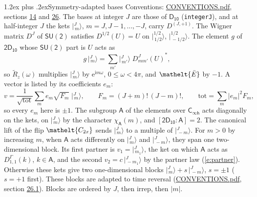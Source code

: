 \documentclass[10pt,a4paper]{article}
\makeatletter
\renewcommand\section{\@startsection{section}{1}{\z@}{-3ex plus -1ex minus -.2ex}%
  {1.2ex plus .2ex}{\normalfont\large\sffamily\bfseries\color{parttitle}}}
\numberwithin{equation}{section}
\newcommand{\eltfont}[1]{{\let\sigma\eltsigma\mathelt{#1}}}
\newcommand{\grp}[1]{\mathsf{#1}}
\newcommand{\elt}[1]{\eltfont{#1}}
\newcommand{\grpindex}[2]{[#1 : #2]}
\newcommand{\iunit}{\mathrm{i}}
\newcommand{\expe}{\mathrm{e}}
\newcommand{\irrJp}[2]{D^{(#1,#2)}}
\newcommand{\repD}[1]{D^{#1}}
\newcommand{\wignerD}[1]{D^{#1}}
\newcommand{\chiA}{\chi_{\grp{A}}}
\newcommand{\conj}[1]{{#1}^{*}}
\newcommand{\jm}[2]{\bigl\lvert{}^{#1}_{\,#2}\bigr\rangle}
\newcommand{\barred}[1]{\bar{#1}}
\newcommand{\lift}[1]{\tilde{#1}}
\makeatother
\begin{document}
\section{Symmetry-adapted bases}\label{s:bases}
Conventions: \href{../../CONVENTIONS.pdf}{CONVENTIONS.pdf}, sections \href{../../../rotation/CONVENTIONS.pdf\#conv.14}{14} and \href{../../CONVENTIONS.pdf\#conv.26}{26}.
\leavevmode\label{n:index.m}\label{n:vector.ket}The bases at integer $J$ are those of \href{../../../rotation/data/pdf/D10.pdf}{$\grp{D_{10}}$} (\texttt{integerJ}), and at half-integer $J$ the kets $\jm{J}{m}$, $m = J, J-1, \dots, -J$, carry $\irrJp{J}{+1}$. \label{n:matrix.wigner}The Wigner matrix $\wignerD{J}$ of $\grp{SU(2)}$ satisfies $\wignerD{1/2}(U) = U$ on $\jm{1/2}{1/2}$, $\jm{1/2}{-1/2}$. The element $g$ of $\grp{2D_{10}}$ whose $\grp{SU(2)}$ part is $U$ acts as
\begin{equation}\label{e:action}g\,\jm{J}{m} = \sum_{m'} \jm{J}{m'}\; \conj{\wignerD{J}_{m m'}(U)},\end{equation}
so $\lift{R}_{z}(\omega)$ multiplies $\jm{J}{m}$ by $\expe^{\iunit m\omega}$, $0 \le \omega < 4\pi$, and $\elt{\barred{E}}$ by $-1$. \label{n:index.ketcoefficient}\label{n:vector.basis.symmetry}\label{n:index.ketweight}\label{n:index.total}A vector is listed by its coefficients $e_m$:
\begin{equation}\label{e:ket}v = \frac{1}{\sqrt{\mathrm{tot}}}\sum_m e_m\sqrt{F_m}\;\jm{J}{m},\qquad F_m = (J+m)!\,(J-m)!,\qquad \mathrm{tot} = \sum_m |e_m|^2F_m,\end{equation}
so every $e_m$ here is $\pm 1$.
\leavevmode\label{n:group.A}\label{n:function.character.abelian}The subgroup $\grp{A}$ of the elements over $\grp{C_{\infty h}}$ acts diagonally on the kets, on $\jm{J}{m}$ by the character $\chiA(m)$, and $\grpindex{\grp{2D_{10}}}{\grp{A}} = 2$. The canonical lift of the flip $\elt{C_{2x}}$ sends $\jm{J}{m}$ to a multiple of $\jm{J}{-m}$. For $m > 0$ by increasing $m$, when $\grp{A}$ acts differently on $\jm{J}{m}$ and $\jm{J}{-m}$, they span one two-dimensional block. \label{n:index.partner.sign}Its first partner is $v_1 = \jm{J}{m_1}$, the ket on which $\grp{A}$ acts as $\repD{\Gamma}_{1,1}(k)$, $k \in \grp{A}$, and the second $v_2 = c\,\jm{J}{-m_1}$ by the partner law (\ref{e:partner}). \label{n:index.pair.sign}Otherwise these kets give two one-dimensional blocks $\jm{J}{m} + s\,\jm{J}{-m}$, $s = \pm 1$ ($s = +1$ first). These blocks are adapted to time reversal (\href{../../CONVENTIONS.pdf}{CONVENTIONS.pdf}, section \href{../../CONVENTIONS.pdf\#conv.26.1}{26.1}). Blocks are ordered by $J$, then irrep, then $|m|$.
\end{document}

